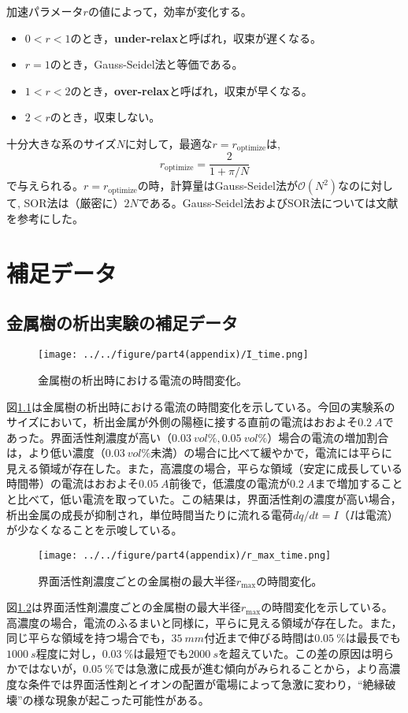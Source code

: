 \documentclass[autodetect-engine,dvi=dvipdfmx,a4paper,ja=standard,oneside,openany]{bxjsbook}
\begin{document}
加速パラメータ$r$の値によって，効率が変化する。
\begin{itemize}
  \item $0<r<1$のとき，\textbf{under-relax}と呼ばれ，収束が遅くなる。
  \item $r=1$のとき，Gauss-Seidel法と等価である。
  \item $1<r<2$のとき，\textbf{over-relax}と呼ばれ，収束が早くなる。
  \item $2<r$のとき，収束しない。
\end{itemize}
十分大きな系のサイズ$N$に対して，最適な$r=r_{\mathrm{optimize}}$は,
\begin{equation}
  r_{\mathrm{optimize}}=\frac{2}{1+\pi/N}
  \label{eq:optimaze_r}
\end{equation}
で与えられる。$r=r_{\mathrm{optimize}}$の時，計算量はGauss-Seidel法が$\mathcal{O}(N^2)$なのに対して, SOR法は（厳密に）$2N$である。Gauss-Seidel法およびSOR法については文献\cite{hinch2020numerical}を参考にした。

\chapter{補足データ}
\section{金属樹の析出実験の補足データ}
\begin{figure}[htbp]
  \centering
  \texttt{[image: ../../figure/part4(appendix)/I\_time.png]}
  \caption{金属樹の析出時における電流の時間変化。}
  \label{fig:I_time}
\end{figure}
図\ref{fig:I_time}は金属樹の析出時における電流の時間変化を示している。今回の実験系のサイズにおいて，析出金属が外側の陽極に接する直前の電流はおおよそ$\SI{0.2}{A}$であった。界面活性剤濃度が高い（$\SI{0.03}{vol\%}, \SI{0.05}{vol\%}$）場合の電流の増加割合は，より低い濃度（$\SI{0.03}{vol\%}$未満）の場合に比べて緩やかで，電流には平らに見える領域が存在した。また，高濃度の場合，平らな領域（安定に成長している時間帯）の電流はおおよそ$\SI{0.05}{A}$前後で，低濃度の電流が$\SI{0.2}{A}$まで増加することと比べて，低い電流を取っていた。この結果は，界面活性剤の濃度が高い場合，析出金属の成長が抑制され，単位時間当たりに流れる電荷$dq/dt=I$（$I$は電流）が少なくなることを示唆している。
\begin{figure}[htbp]
  \centering
  \texttt{[image: ../../figure/part4(appendix)/r\_max\_time.png]}
  \caption{界面活性剤濃度ごとの金属樹の最大半径$r_{\mathrm{max}}$の時間変化。}
  \label{fig:r_max_time}
\end{figure}
図\ref{fig:r_max_time}は界面活性剤濃度ごとの金属樹の最大半径$r_{\mathrm{max}}$の時間変化を示している。高濃度の場合，電流のふるまいと同様に，平らに見える領域が存在した。また，同じ平らな領域を持つ場合でも，$\SI{35}{mm}$付近まで伸びる時間は$\SI{0.05}{\%}$は最長でも$\SI{1000}{s}$程度に対し，$\SI{0.03}{\%}$は最短でも$\SI{2000}{s}$を超えていた。この差の原因は明らかではないが，$\SI{0.05}{\%}$では急激に成長が進む傾向がみられることから，より高濃度な条件では界面活性剤とイオンの配置が電場によって急激に変わり，``絶縁破壊''の様な現象が起こった可能性がある。
\end{document}
